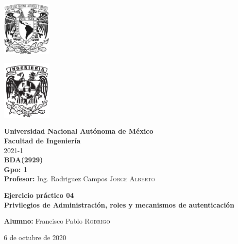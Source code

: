\documentclass{article}
\newcommand{\materia}{BDA}
\newcommand{\clave}{2929}
\newcommand{\profesor}{Ing. Rodriguez Campos \textsc{Jorge Alberto}}
\newcommand{\semestre}{2021-1}
\newcommand{\alumno}{Francisco Pablo \textsc{Rodrigo}}
\newcommand{\actividad}{Ejercicio práctico 04}
\newcommand{\titulo}{Privilegios de Administración, roles y mecanismos 
    de autenticación}
\newcommand{\fechaEntrega}{6 de octubre de 2020}
\begin{document}
\thispagestyle{empty}
\begin{minipage}[t][5cm][t]{0.2\linewidth}
    \includegraphics[width=2.5cm]{unam.jpg}
    \vspace{10cm}

    \includegraphics[width=2.5cm]{fiblack}
\end{minipage}
\begin{minipage}[t]{0.7\linewidth}
    \vspace{-2.5cm}
    \LARGE{\textbf{Universidad Nacional Autónoma de México}}\\
    \Large{\textbf{Facultad de Ingeniería}} \\

    \large{\semestre}\\[2cm]

    \large{\textbf{\materia (\clave)}}\\
    \large{\textbf{Gpo: 1}}\\[5mm]
    \large{\textbf{Profesor:} \profesor}\\ [1.5cm]
    \begin{center}
        \LARGE{\textbf{\actividad}}\\
        \LARGE{\textbf{\titulo}}\\
    \end{center}

    \vspace{3.3cm}

    \large{\textbf{Alumno:} \alumno} \\[1.5cm]

    \begin{flushright}
        \fechaEntrega%
    \end{flushright}
\end{minipage}

\newpage
\end{document}
